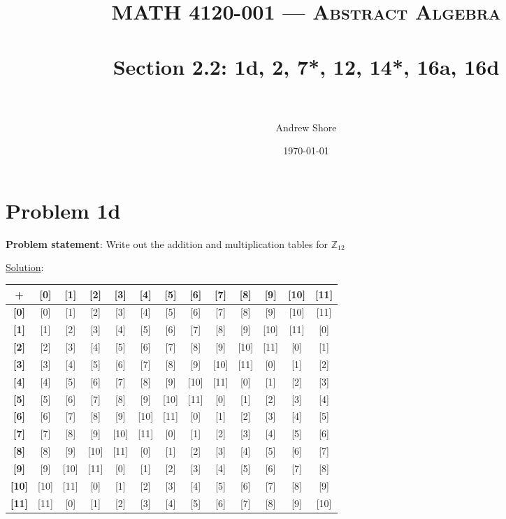 \documentclass{article} %
\title{ 
\normalfont \normalsize 
\textsc{MATH 4120-001 --- Abstract Algebra} \\
\horrule{0.5pt} \\[0cm] %
\huge Section 2.2: 1d, 2, 7*, 12, 14*, 16a, 16d \\ %
\horrule{2pt} \\[0cm] %
}
\author{Andrew Shore} %
\date{\normalsize\today} %
\begin{document}
\maketitle %

\section*{Problem 1d}


\textbf{Problem statement}: Write out the addition and multiplication tables for $\mathbb{Z}_{12}$

\underline{Solution}: 
\begin{addmargin}[1em]{0em}
\begin{tabular}{|c|c|c|c|c|c|c|c|c|c|c|c|c|}
\hline
\textbf{+}&\textbf{[0]}&\textbf{[1]}&\textbf{[2]}&\textbf{[3]}&\textbf{[4]}&\textbf{[5]}&\textbf{[6]}&\textbf{[7]}&\textbf{[8]}&\textbf{[9]}&\textbf{[10]}&\textbf{[11]}\\ \hline
\textbf{[0]} & [0] & [1] & [2] & [3] & [4] & [5] & [6] & [7] & [8] & [9] & [10] & [11] \\ \hline
\textbf{[1]} & [1] & [2] & [3] & [4] & [5] & [6] & [7] & [8] & [9] & [10] & [11] & [0]\\ \hline
\textbf{[2]} & [2] & [3] & [4] & [5] & [6] & [7] & [8] & [9] & [10] & [11] & [0] & [1]\\ \hline
\textbf{[3]} & [3] & [4] & [5] & [6] & [7] & [8] & [9] & [10] & [11] & [0] & [1] & [2]\\ \hline
\textbf{[4]} & [4] & [5] & [6] & [7] & [8] & [9] & [10] & [11] & [0] & [1] & [2] & [3]\\ \hline
\textbf{[5]} & [5] & [6] & [7] & [8] & [9] & [10] & [11] & [0] & [1] & [2] & [3] & [4]\\ \hline
\textbf{[6]} & [6] & [7] & [8] & [9] & [10] & [11] & [0] & [1] & [2] & [3] & [4] & [5]\\ \hline
\textbf{[7]} & [7] & [8] & [9] & [10] & [11] & [0] & [1] & [2] & [3] & [4] & [5] & [6]\\ \hline
\textbf{[8]} & [8] & [9] & [10] & [11] & [0] & [1] & [2] & [3] & [4] & [5] & [6] & [7]\\ \hline
\textbf{[9]} & [9] & [10] & [11] & [0] & [1] & [2] & [3] & [4] & [5] & [6] & [7] & [8]\\ \hline
\textbf{[10]} & [10] & [11] & [0] & [1] & [2] & [3] & [4] & [5] & [6] & [7] & [8] & [9]\\ \hline
\textbf{[11]} & [11] & [0] & [1] & [2] & [3] & [4] & [5] & [6] & [7] & [8] & [9] & [10]\\ \hline


\end{tabular}
\end{addmargin}
\end{document}
